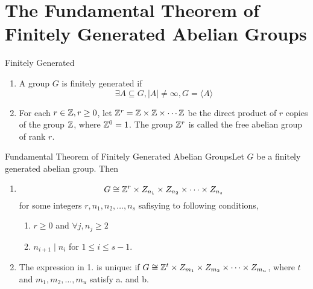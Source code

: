 \documentclass{report}
\newcommand{\thm}[2]{\begin{Theorem}{#1}{}#2\end{Theorem}}
\newcommand{\dfn}[2]{\begin{Definition}[colbacktitle=red!75!black]{#1}{}#2\end{Definition}}
\begin{document}
\section{The Fundamental Theorem of Finitely Generated Abelian Groups}
\dfn{Finitely Generated}{\begin{enumerate}
    \item A group $G$ is finitely generated if
    $$\exists A\subseteq G, |A| \neq \infty, G=\langle A\rangle$$
    \item For each $r \in \mathbb{Z}, r \geq 0$, let $\mathbb{Z}^r = \mathbb{Z} \times \mathbb{Z} \times \cdots \mathbb{Z}$ be the direct product of $r$ copies of the group $\mathbb{Z}$, where $\mathbb{Z}^0 = 1$. The group $\mathbb{Z}^r$ is called the free abelian group of rank $r$. 
\end{enumerate}}
\thm{Fundamental Theorem of Finitely Generated Abelian Groups}{Let $G$ be a finitely generated abelian group. Then \begin{enumerate}
    \item $$G \cong \mathbb{Z}^r \times Z_{n_1} \times Z_{n_2} \times \cdots \times Z_{n_s}$$
    for some integers $r, n_1, n_2, \dots, n_s$ safisying to following conditions, \begin{enumerate}[label=\alph*.]
    \item $r \geq 0$ and $\forall j, n_j \geq 2$ 
    \item $n_{i+1} \mid n_i$ for $1 \leq i \leq s-1$. 
    \end{enumerate}
    \item The expression in 1. is unique: if $G \cong \mathbb{Z}^t \times Z_{m_1} \times Z_{m_2} \times \cdots \times Z_{m_u}$, where $t$ and $m_1, m_2, \dots, m_u$ satisfy a. and b. 
\end{enumerate}}
\end{document}
